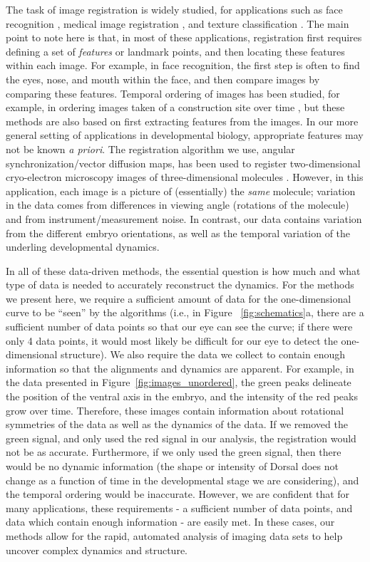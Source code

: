\documentclass{pnastwo}
\begin{document}
\begin{article}
The task of image registration is widely studied, for applications such as face recognition \cite{rowley1998rotation}, medical image registration \cite{hajnal2010medical}, and texture classification \cite{greenspan1994rotation}.
%
The main point to note here is that, in most of these applications, registration first requires defining a set of {\em features} or landmark points, and then locating these features within each image.
%
For example, in face recognition, the first step is often to find the eyes, nose, and mouth within the face, and then compare images by comparing these features.
%
Temporal ordering of images has been studied, for example, in ordering images taken of a construction site over time \cite{schindler2007inferring}, 
but these methods are also based on first extracting features from the images. 
%
In our more general setting of applications in developmental biology, appropriate features may not be known {\em a priori}.
%
The registration algorithm we use, angular synchronization/vector diffusion maps, has been used to register two-dimensional cryo-electron microscopy images of three-dimensional molecules \cite{singer2011three}.
%
However, in this application, each image is a picture of (essentially) the {\em same} molecule; variation in the data comes from differences in viewing angle (rotations of the molecule) and from instrument/measurement noise.
%
In contrast, our data contains variation from the different embryo orientations, as well as the temporal variation of the underling developmental dynamics. 

In all of these data-driven methods, the essential question is how much and what type of data is needed to accurately reconstruct the dynamics. 
%
For the methods we present here, we require a sufficient amount of data for the one-dimensional curve to be ``seen'' by the algorithms (i.e., in Figure ~\ref{fig:schematics}a, there are a sufficient number of data points so that our eye can see the curve; if there were only 4 data points, it would most likely be difficult for our eye to detect the one-dimensional structure).
%
We also require the data we collect to contain enough information so that the alignments and dynamics are apparent.
%
For example, in the data presented in Figure~\ref{fig:images_unordered}, the green peaks delineate the position of the ventral axis in the embryo, and the intensity of the red peaks grow over time.
%
Therefore, these images contain information about rotational symmetries of the data as well as the dynamics of the data.
%
If we removed the green signal, and only used the red signal in our analysis, the registration would not be as accurate.
%
Furthermore, if we only used the green signal, then there would be no dynamic information (the shape or intensity of Dorsal does not change as a function of time in the developmental stage we are considering), and the temporal ordering would be inaccurate.
%
However, we are confident that for many applications, these requirements - a sufficient number of data points, and data which contain enough information - are easily met. 
%
In these cases, our methods allow for the rapid, automated analysis of imaging data sets to help uncover complex dynamics and structure. 


\end{article}
\end{document}
